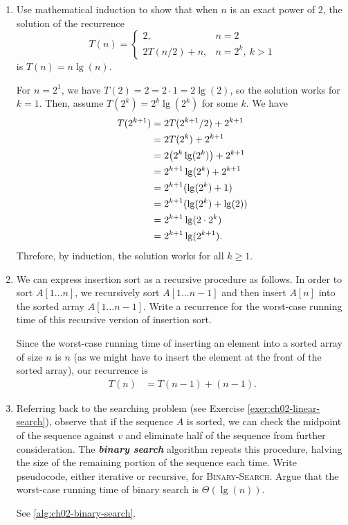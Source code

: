 \documentclass[Chapter02]{subfiles}
\begin{document}
\begin{enumerate}[leftmargin=\labelsep]
		\item Use mathematical induction to show that when $n$ is an exact power of 2, the solution of the recurrence
		\[
			T(n) = 
			\begin{cases}
				2, & n = 2\\
				2T(n / 2) + n, & n = 2^k,\ k > 1
			\end{cases}
		\]
		is $T(n) = n\lg(n)$.
		\begin{answer}
			For $n = 2^1$, we have $T(2) = 2 = 2 \cdot 1 = 2 \lg(2)$, so the solution works for $k = 1$. Then, assume $T(2^k) = 2^k \lg(2^k)$ for some $k$. We have
			\begin{align*}
				T(2^{k + 1}) &= 2T(2^{k+1} / 2) + 2^{k + 1}\\
					&=  2T(2^k) + 2^{k + 1}\\
					&= 2\qty(2^k \lg(2^k)) + 2^{k + 1}\\
					&= 2^{k + 1} \lg(2^k) + 2^{k + 1}\\
					&= 2^{k + 1}(\lg(2^k) + 1)\\
					&= 2^{k + 1}(\lg(2^k) + \lg(2))\\
					&= 2^{k + 1}\lg(2 \cdot 2^k)\\
					&= 2^{k + 1}\lg(2^{k + 1}).
			\end{align*}
			Threfore, by induction, the solution works for all $k \geq 1$.
		\end{answer}

		\item We can express insertion sort as a recursive procedure as follows. In order to sort $A[1 \dots n]$, we recursively sort $A[1 \dots n-1]$ and then insert $A[n]$ into the sorted array $A[1 \dots n-1]$. Write a recurrence for the worst-case running time of this recursive version of insertion sort.
		\begin{answer}
			Since the worst-case running time of inserting an element into a sorted array of size $n$ is $n$ (as we might have to insert the element at the front of the sorted array), our recurrence is
			\begin{align*}
				T(n) &= T(n - 1) + (n - 1).
			\end{align*}
		\end{answer}

		\item \label{exer:ch02-binary-search} Referring back to the searching problem (see Exercise \ref{exer:ch02-linear-search}), observe that if the sequence $A$ is sorted, we can check the midpoint of the sequence against $v$ and eliminate half of the sequence from further consideration. The \textbf{\textit{binary search}} algorithm repeats this procedure, halving the size of the remaining portion of the sequence each time. Write pseudocode, either iterative or recursive, for \textsc{Binary-Search}. Argue that the worst-case running time of binary search is $\Theta(\lg(n))$.
		\begin{answer}
			See \autoref{alg:ch02-binary-search}.


\end{answer}
\end{enumerate}
\end{document}
